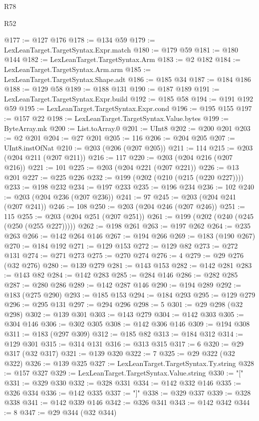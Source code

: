 \begin{lexlean}{R78}
\begin{lexlean}{R52}
\begin{coremodule}
{{{{{{{{{{{{{{{{{{{{{{{{{{{{{{{{{{{{{{{{{{{{{{{{{{{{{{{{{{{{{{{{{{{{{{{{{{{{{{{{{{{{{{{{{{{{{{{{{{{{{{{{{{{{{{{{{{{{{{{{{{{{{{{{{{{{{{{{{{{{{{{{{{{{{{{{{{{{{{{{{{{{{{{{{{{{{{{{{{{{{{{{{{{{{{{{{{{{{{@177 := @127 @176
@178 := @134 @59
@179 := LexLeanTarget.TargetSyntax.Expr.match
@180 := @179 @59
@181 := @180 @144
@182 := LexLeanTarget.TargetSyntax.Arm
@183 := @2 @182
@184 := LexLeanTarget.TargetSyntax.Arm.arm
@185 := LexLeanTarget.TargetSyntax.Shape.adt
@186 := @185 @34
@187 := @184 @186
@188 := @129 @58
@189 := @188 @131
@190 := @187 @189
@191 := LexLeanTarget.TargetSyntax.Expr.build
@192 := @185 @58
@194 := @191 @192 @59
@195 := LexLeanTarget.TargetSyntax.Expr.cond
@196 := @195 @155
@197 := @157 @22
@198 := LexLeanTarget.TargetSyntax.Value.bytes
@199 := ByteArray.mk
@200 := List.toArray.{0}
@201 := UInt8
@202 := @200 @201
@203 := @2 @201
@204 := @27 @201
@205 := 116
@206 := @204 @205
@207 := UInt8.instOfNat
@210 := @203 (@206 (@207 @205))
@211 := 114
@215 := @203 (@204 @211 (@207 @211))
@216 := 117
@220 := @203 (@204 @216 (@207 @216))
@221 := 101
@225 := @203 (@204 @221 (@207 @221))
@226 := @13 @201
@227 := @225 @226
@232 := @199 (@202 (@210 (@215 (@220 @227))))
@233 := @198 @232
@234 := @197 @233
@235 := @196 @234
@236 := 102
@240 := @203 (@204 @236 (@207 @236))
@241 := 97
@245 := @203 (@204 @241 (@207 @241))
@246 := 108
@250 := @203 (@204 @246 (@207 @246))
@251 := 115
@255 := @203 (@204 @251 (@207 @251))
@261 := @199 (@202 (@240 (@245 (@250 (@255 @227)))))
@262 := @198 @261
@263 := @197 @262
@264 := @235 @263
@266 := @142 @264 @146
@267 := @194 @266
@269 := @183 (@190 @267)
@270 := @184 @192
@271 := @129 @153
@272 := @129 @82
@273 := @272 @131
@274 := @271 @273
@275 := @270 @274
@276 := 4
@279 := @29 @276 (@32 @276)
@280 := @139 @279
@281 := @143 @153
@282 := @142 @281
@283 := @143 @82
@284 := @142 @283
@285 := @284 @146
@286 := @282 @285
@287 := @280 @286
@289 := @142 @287 @146
@290 := @194 @289
@292 := @183 (@275 @290)
@293 := @185 @153
@294 := @184 @293
@295 := @129 @279
@296 := @295 @131
@297 := @294 @296
@298 := 5
@301 := @29 @298 (@32 @298)
@302 := @139 @301
@303 := @143 @279
@304 := @142 @303
@305 := @304 @146
@306 := @302 @305
@308 := @142 @306 @146
@309 := @194 @308
@311 := @183 (@297 @309)
@312 := @185 @82
@313 := @184 @312
@314 := @129 @301
@315 := @314 @131
@316 := @313 @315
@317 := 6
@320 := @29 @317 (@32 @317)
@321 := @139 @320
@322 := 7
@325 := @29 @322 (@32 @322)
@326 := @139 @325
@327 := LexLeanTarget.TargetSyntax.Ty.string
@328 := @157 @327
@329 := LexLeanTarget.TargetSyntax.Value.string
@330 := "["
@331 := @329 @330
@332 := @328 @331
@334 := @142 @332 @146
@335 := @326 @334
@336 := @142 @335
@337 := "]"
@338 := @329 @337
@339 := @328 @338
@341 := @142 @339 @146
@342 := @326 @341
@343 := @142 @342
@344 := 8
@347 := @29 @344 (@32 @344)
}}}}}}}}}}}}}}}}}}}}}}}}}}}}}}}}}}}}}}}}}}}}}}}}}}}}}}}}}}}}}}}}}}}}}}}}}}}}}}}}}}}}}}}}}}}}}}}}}}}}}}}}}}}}}}}}}}}}}}}}}}}}}}}}}}}}}}}}}}}}}}}}}}}}}}}}}}}}}}}}}}}}}}}}}}}}}}}}}}}}}}}}}}}}}}}}}}}}}}
\end{coremodule}
\end{lexlean}
\end{lexlean}
